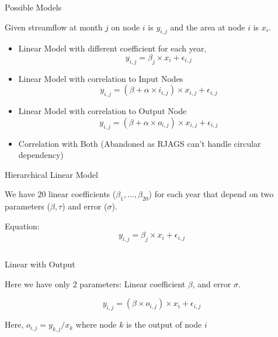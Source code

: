 \documentclass{beamer}
\begin{document}
\begin{frame}{Possible Models}

  Given streamflow at month \(j\) on node \(i\) is \(y_{i,j}\) and the area at node \(i\) is \(x_{i}\).

  \begin{itemize}
  \item Linear Model with different coefficient for each year,
    \begin{equation*}
      y_{i,j} = \beta_{j} \times x_{i} + \epsilon_{i,j}
    \end{equation*}
    
  \item Linear Model with correlation to Input Nodes
    \begin{equation*}
      y_{i,j} = (\beta + \alpha \times i_{i,j}) \times x_{i,j} + \epsilon_{i,j}
    \end{equation*}
    
  \item Linear Model with correlation to Output Node
    \begin{equation*}
      y_{i,j} = (\beta + \alpha \times o_{i,j}) \times x_{i,j} + \epsilon_{i,j}
    \end{equation*}

  \item Correlation with Both ({\color{red}Abandoned} as RJAGS can't handle circular dependency)
  \end{itemize}

\end{frame}

\begin{frame}[containsverbatim]{Hierarchical Linear Model}

  We have 20 linear coefficients (\(\beta_1,\hdots,\beta_{20}\)) for each year that depend on two parameters (\(\beta, \tau\)) and error (\(\sigma\)).

  Equation:
    \begin{equation*}
      y_{i,j} = \beta_{j} \times x_{i} + \epsilon_{i,j}
    \end{equation*}

    \vspace{0.2cm}
    
\inputminted{jags}{linear.jags}
\end{frame}

\begin{frame}{Linear with Output}

  Here we have only 2 parameters: Linear coefficient \(\beta\), and error \(\sigma\).

    \begin{equation*}
      y_{i,j} = (\beta \times o_{i,j}) \times x_{i} + \epsilon_{i,j}
    \end{equation*}

    Here, \(o_{i,j} = y_{k,j} / x_k\) where node \(k\) is the output of node \(i\)
\end{frame}
\end{document}
